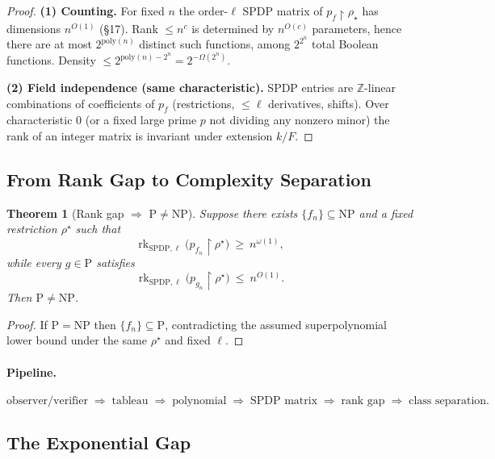 \documentclass[12pt]{article}
\newtheorem{theorem}{Theorem}
\theoremstyle{definition}
\theoremstyle{definition}
\theoremstyle{remark}
\theoremstyle{remark}
\begin{document}
\begin{proof}
\textbf{(1) Counting.} For fixed $n$ the order-$\ell$ SPDP matrix of $p_f\!\upharpoonright\rho_\star$ has dimensions $n^{O(1)}$ (\S17). Rank $\le n^c$ is determined by $n^{O(c)}$ parameters, hence there are at most $2^{\mathrm{poly}(n)}$ distinct such functions, among $2^{2^n}$ total Boolean functions. Density $\le 2^{\mathrm{poly}(n)-2^n}=2^{-\Omega(2^n)}$.

\textbf{(2) Field independence (same characteristic).} SPDP entries are $\mathbb{Z}$-linear combinations of coefficients of $p_f$ (restrictions, $\le\ell$ derivatives, shifts). Over characteristic $0$ (or a fixed large prime $p$ not dividing any nonzero minor) the rank of an integer matrix is invariant under extension $k/F$.
\end{proof}

\subsection{From Rank Gap to Complexity Separation}

\begin{theorem}[Rank gap $\Rightarrow$ $\mathrm P\neq\mathrm{NP}$]\label{thm:rank-gap-implies-pnp}\label{thm:rank-gap}
Suppose there exists $\{f_n\}\subseteq\mathrm{NP}$ and a fixed restriction $\rho^\star$ such that
\[
\operatorname{rk}_{\mathrm{SPDP},\ell}\big(p_{f_n}\!\upharpoonright \rho^\star\big)\ \ge\ n^{\omega(1)},
\]
while every $g\in\mathrm P$ satisfies
\[
\operatorname{rk}_{\mathrm{SPDP},\ell}\big(p_{g_n}\!\upharpoonright \rho^\star\big)\ \le\ n^{O(1)}.
\]
Then $\mathrm P\neq \mathrm{NP}$.
\end{theorem}

\begin{proof}
If $\mathrm P=\mathrm{NP}$ then $\{f_n\}\subseteq\mathrm P$, contradicting the assumed
superpolynomial lower bound under the same $\rho^\star$ and fixed $\ell$.
\end{proof}

\paragraph{Pipeline.}
\[
\text{observer/verifier}\;\Rightarrow\;\text{tableau}\;\Rightarrow\;\text{polynomial}\;
\Rightarrow\;\text{SPDP matrix}\;\Rightarrow\;\text{rank gap}\;\Rightarrow\;\text{class separation}.
\]

\subsection{The Exponential Gap}
\end{document}
